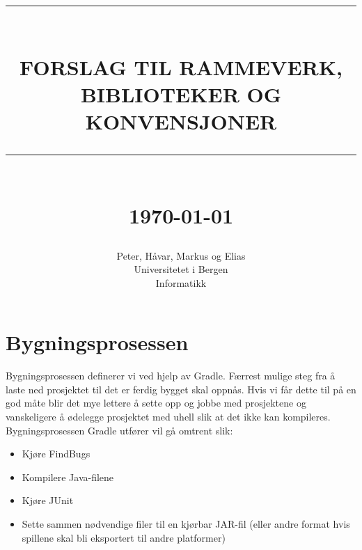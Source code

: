 \documentclass[12pt]{report}
\newcommand{\HRule}[1]{\rule{\linewidth}{#1}}
\begin{document}
\title{ \normalsize \textsc{}
		\\ [2.0cm]
		\HRule{0.5pt} \\
		\LARGE \textbf{\uppercase{Forslag til rammeverk,
biblioteker og konvensjoner}}
		\HRule{2pt} \\ [0.5cm]
		\normalsize \today \vspace*{5\baselineskip}}

\date{}

\author{
		Peter, H{\aa}var, Markus og Elias \\ 
		Universitetet i Bergen \\
		Informatikk }

\maketitle
\tableofcontents
\newpage

\sectionfont{\scshape}


\section*{Bygningsprosessen}

Bygningsprosessen definerer vi ved hjelp av Gradle. F{\ae}rrest mulige steg fra {\aa} laste ned prosjektet til det er
ferdig bygget skal oppn{\aa}s. Hvis vi f{\aa}r dette til p{\aa} en god m{\aa}te blir det mye lettere {\aa} sette opp og
jobbe med prosjektene og vanskeligere {\aa} {\o}delegge prosjektet med uhell slik at det ikke kan kompileres.\\

Bygningsprosessen Gradle utf{\o}rer vil g{\aa} omtrent slik:

\begin{itemize}
\item Kj{\o}re FindBugs
\item Kompilere Java-filene
\item Kj{\o}re JUnit
\item Sette sammen n{\o}dvendige filer til en kj{\o}rbar JAR-fil (eller andre format hvis spillene skal bli eksportert
til andre platformer)
\end{itemize}
\end{document}
